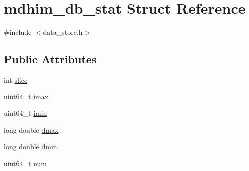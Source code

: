 \hypertarget{structmdhim__db__stat}{\section{mdhim\-\_\-db\-\_\-stat Struct Reference}
\label{db/d64/structmdhim__db__stat}
}


{\ttfamily \#include $<$data\-\_\-store.\-h$>$}

\subsection*{Public Attributes}
\begin{DoxyCompactItemize}
\item 
int \hyperlink{structmdhim__db__stat_af69e251abcde91c5441f7a55c408ab55}{slice}
\item 
uint64\-\_\-t \hyperlink{structmdhim__db__stat_a58ff0fbdb99c6f23d7cb8945c2f9b6e0}{imax}
\item 
uint64\-\_\-t \hyperlink{structmdhim__db__stat_a76f68ccd3a2fabdd949512ab7bcacd5d}{imin}
\item 
long double \hyperlink{structmdhim__db__stat_a1ccd0e75db4b05ea4ef48b2e36c757f5}{dmax}
\item 
long double \hyperlink{structmdhim__db__stat_ac1f4a8cb1a2a1c567245bc5b8ecfdc05}{dmin}
\item 
uint64\-\_\-t \hyperlink{structmdhim__db__stat_a362426563ec5fbc354dfdbf31e68d691}{num}
\end{DoxyCompactItemize}


